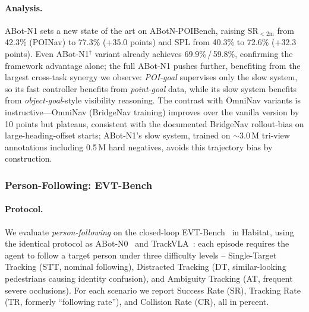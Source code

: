 \paragraph{Analysis.}
ABot-N1 sets a new state of the art on ABotN-POIBench, raising
SR$_{<2\mathrm{m}}$ from 42.3\% (POINav) to 77.3\% (+35.0 points)
and SPL from 40.3\% to 72.6\% (+32.3 points). Even ABot-N1$^\dagger$
variant already achieves 69.9\%\,/\,59.8\%, confirming the framework
advantage alone; the full ABot-N1 pushes further, benefiting from
the largest cross-task synergy we observe: \textit{POI-goal} supervises
only the slow system, so its fast controller benefits from
\textit{point-goal} data, while its slow system benefits from
\textit{object-goal}-style visibility reasoning. The contrast with
OmniNav variants is instructive---OmniNav (BridgeNav training)
improves over the vanilla version by 10 points but plateaus,
consistent with the documented BridgeNav rollout-bias on
large-heading-offset starts; ABot-N1's slow system, trained on
$\sim$3.0\,M tri-view annotations including 0.5\,M hard negatives,
avoids this trajectory bias by construction.

\FloatBarrier
\subsubsection{Person-Following: EVT-Bench}
\label{sec:exp-pf}

\paragraph{Protocol.}
We evaluate \textit{person-following} on the closed-loop
EVT-Bench~\cite{wang2025trackvla} in Habitat, using the
identical protocol as ABot-N0~\cite{abotn0} and
TrackVLA~\cite{wang2025trackvla}: each episode requires
the agent to follow a target person under three difficulty
levels -- Single-Target Tracking (STT, nominal following),
Distracted Tracking (DT, similar-looking pedestrians causing
identity confusion), and Ambiguity Tracking (AT, frequent
severe occlusions). For each scenario we report Success
Rate (SR), Tracking Rate (TR, formerly ``following rate''),
and Collision Rate (CR), all in percent.

